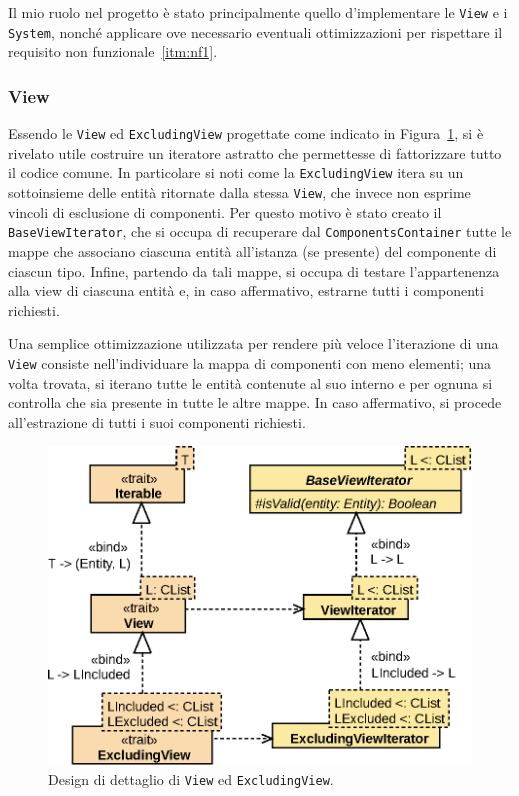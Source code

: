 Il mio ruolo nel progetto è stato principalmente quello d'implementare le \texttt{View} e i \texttt{System}, nonché
applicare ove necessario eventuali ottimizzazioni per rispettare il requisito non funzionale~\ref{itm:nf1}.

\subsubsection{View}

Essendo le \texttt{View} ed \texttt{ExcludingView} progettate come indicato in Figura~\ref{fig:view}, si è rivelato
utile costruire un iteratore astratto che permettesse di fattorizzare tutto il codice comune.
In particolare si noti come la \texttt{ExcludingView} itera su un sottoinsieme delle entità ritornate dalla stessa
\texttt{View}, che invece non esprime vincoli di esclusione di componenti.
Per questo motivo è stato creato il \texttt{BaseViewIterator}, che si occupa di recuperare dal
\texttt{ComponentsContainer} tutte le mappe che associano ciascuna entità all'istanza (se presente) del componente di
ciascun tipo.
Infine, partendo da tali mappe, si occupa di testare l'appartenenza alla view di ciascuna entità e, in caso affermativo,
estrarne tutti i componenti richiesti.

Una semplice ottimizzazione utilizzata per rendere più veloce l'iterazione di una \texttt{View} consiste
nell'individuare la mappa di componenti con meno elementi;
una volta trovata, si iterano tutte le entità contenute al suo interno e per ognuna si controlla che sia presente in
tutte le altre mappe.
In caso affermativo, si procede all'estrazione di tutti i suoi componenti richiesti.

\begin{figure}
    \includegraphics{./img/View}
    \caption{Design di dettaglio di \texttt{View} ed \texttt{ExcludingView}.}
    \label{fig:view}
\end{figure}

